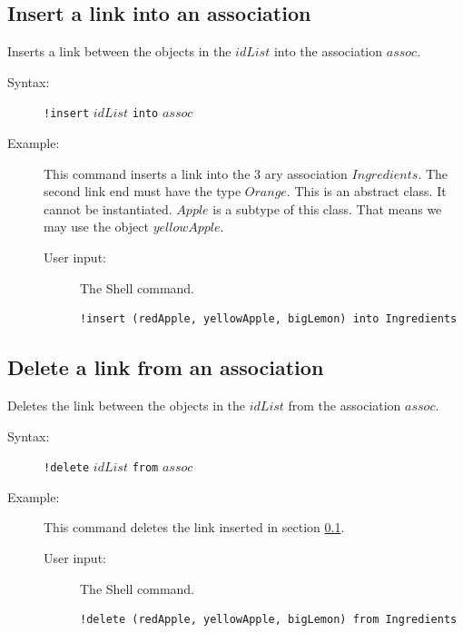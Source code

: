 \documentclass[a4paper,titlepage,oneside,final]{scrreprt} %
\begin{document}
\subsection{Insert a link into an association}\label{insertInto}
Inserts a link between the objects in the $\mathit{idList}$ into the association $\mathit{assoc}$.
\begin{description}
\item[Syntax:] \verb+!insert+ $\mathit{idList}$ \verb+into+ $\mathit{assoc}$
\item[Example:] This command inserts a link into the 3 ary association $\mathit{Ingredients}$.
The second link end must have the type $\mathit{Orange}$. This is an abstract class. It cannot be instantiated.
$\mathit{Apple}$ is a subtype of this class. That means we may use the object $\mathit{yellowApple}$.
\begin{description}
\item[User input:] The Shell command.
\begin{verbatim}
!insert (redApple, yellowApple, bigLemon) into Ingredients
\end{verbatim}
\end{description}
\end{description}
\subsection{Delete a link from an association}
Deletes the link between the objects in the $\mathit{idList}$ from the association $\mathit{assoc}$.
\begin{description}
\item[Syntax:] \verb+!delete+ $\mathit{idList}$ \verb+from+ $\mathit{assoc}$
\item[Example:] This command deletes the link inserted in section \ref{insertInto}.
\begin{description}
\item[User input:] The Shell command.
\begin{verbatim}
!delete (redApple, yellowApple, bigLemon) from Ingredients
\end{verbatim}
\end{description}
\end{description}
\end{document}
